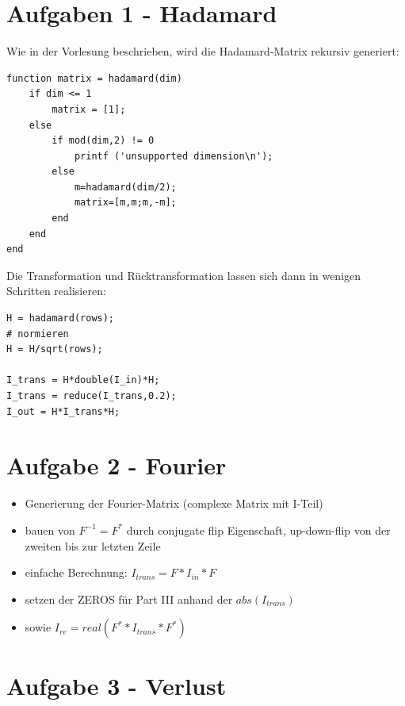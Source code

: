 




\newcommand{\nr}{1}


\section*{Aufgaben 1 - Hadamard}
Wie in der Vorlesung beschrieben, wird die Hadamard-Matrix rekursiv generiert:

\lstset{language=matlab}
\begin{lstlisting}[]
function matrix = hadamard(dim)
    if dim <= 1
        matrix = [1];
    else
        if mod(dim,2) != 0
            printf ('unsupported dimension\n');
        else
            m=hadamard(dim/2);
            matrix=[m,m;m,-m];
        end
    end
end
\end{lstlisting}

Die Transformation und R\"ucktransformation lassen sich dann in wenigen Schritten realisieren:


\lstset{language=matlab}
\begin{lstlisting}[]
H = hadamard(rows);
# normieren
H = H/sqrt(rows);

I_trans = H*double(I_in)*H;
I_trans = reduce(I_trans,0.2);
I_out = H*I_trans*H;
\end{lstlisting}

\section*{Aufgabe 2 - Fourier} 

\begin{itemize}
\item Generierung der Fourier-Matrix (complexe Matrix mit I-Teil)
\item bauen von $F^{-1} = F^*$ durch conjugate flip Eigenschaft, up-down-flip von der zweiten bis zur letzten Zeile
\item einfache Berechnung: $I_{trans} = F * I_{in} * F$
\item setzen der ZEROS f\"ur Part III anhand der $abs(I_{trans})$
\item sowie $I_{re} = real( F^* * I_{trans} * F^* )$
\end{itemize}

\section*{Aufgabe 3 - Verlust}
